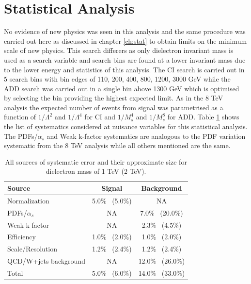 \section{Statistical Analysis}
	\label{sec:7tev_stat}

	No evidence of new physics was seen in this analysis and the same procedure was carried out here as discussed in chapter \ref{ch:stat} to obtain limits on the minimum scale of new physics. This search differers as only dielectron invariant mass is used as a search variable and search bins are found at a lower invariant mass due to the lower energy and statistics of this analysis. The CI search is carried out in 5 search bins with bin edges of {110, 200, 400, 800, 1200, 3000} GeV while the ADD search was carried out in a single bin above 1300 GeV which is optimised by selecting the bin providing the highest expected limit. As in the 8 TeV analysis the expected number of events from signal was parametrised as a function of $1/\Lambda^{2}$ and $1/\Lambda^{4}$ for CI and $1/M_{s}^{4}$ and $1/M_{s}^{8}$ for ADD. Table \ref{tab:sys7} shows the list of systematics considered at nuisance variables for this statistical analysis. The PDFs/$\alpha_{s}$ and Weak k-factor systematics are analogous to the PDF variation systematic from the 8 TeV analysis while all others mentioned are the same. 


	\begin {table}[h]
        \begin{center}
        \begin{tabular}{ | l | c c | } 
            \hline
            Source 					& Signal            & Background         		\\
            \hline
            Normalization       	& 5.0\% ~(5.0\%)      	& NA        			\\
			PDFs/$\alpha_{s}$		& NA 			      	& 7.0\% ~(20.0\%)      	\\
			Weak k-factor       	& NA 			      	& 2.3\% ~(4.5\%)       	\\
			Efficiency  	     	& 1.0\% ~(2.0\%)      	& 1.0\% ~(2.0\%)       	\\
			Scale/Resolution       	& 1.2\% ~(2.4\%)      	& 1.2\% ~(2.4\%)       	\\
			QCD/W+jets background  	& NA 			      	& 12.0\% ~(26.0\%)      \\
            \hline  
            Total               	& 5.0\% ~(6.0\%)      	& 14.0\% ~(33.0\%)      \\
            \hline
        \end{tabular}
        \caption{All sources of systematic error and their approximate size for dielectron mass of 1 TeV (2 TeV).}
        \label{tab:sys7}
        \end{center}
    \end {table}



